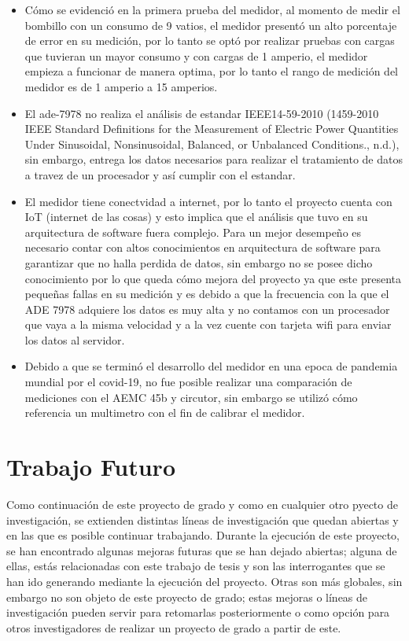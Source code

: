 \begin{itemize}
    \item Cómo se evidenció en la primera prueba del medidor, al momento de medir el bombillo con un consumo de 9 vatios, el medidor presentó un alto porcentaje de error en su medición, por lo tanto se optó por realizar pruebas con cargas que tuvieran un mayor consumo y con cargas de 1 amperio, el medidor empieza a funcionar de manera optima, por lo tanto el rango de medición del medidor es de 1 amperio a 15 amperios.
    \item El ade-7978 no realiza el análisis de estandar IEEE14-59-2010 (1459-2010 IEEE Standard Definitions for the Measurement of Electric Power Quantities Under Sinusoidal, Nonsinusoidal, Balanced, or Unbalanced Conditions., n.d.), sin embargo, entrega los datos necesarios para realizar el tratamiento de datos a travez de un procesador y así cumplir con el estandar.
    \item El medidor tiene conectvidad a internet, por lo tanto el proyecto cuenta con IoT (internet de las cosas) y esto implica que el análisis que tuvo en su arquitectura de software fuera complejo. Para un mejor desempeño es necesario contar con  altos conocimientos en arquitectura de software para garantizar que no halla perdida de datos, sin embargo no se posee dicho conocimiento por lo que queda cómo mejora del proyecto ya que este presenta pequeñas fallas en su medición y es debido a que la frecuencia con la que el ADE 7978 adquiere los datos es muy alta y no contamos con un procesador que vaya a la misma velocidad y a la vez cuente con tarjeta wifi para enviar los datos al servidor.
    \item Debido a que se terminó el desarrollo del medidor en una epoca de pandemia mundial por el covid-19, no fue posible realizar una comparación de mediciones con el AEMC 45b y circutor, sin embargo se utilizó cómo referencia un multimetro con el fin de calibrar el medidor.
\end{itemize}
\chapter{ Trabajo Futuro}
Como continuación de este proyecto de grado y como en cualquier otro pyecto de investigación, se extienden distintas líneas de investigación que quedan abiertas y en las que es posible continuar trabajando. Durante la ejecución de este proyecto, se han encontrado algunas mejoras futuras que se han dejado abiertas; alguna de ellas, estás relacionadas con este trabajo de tesis y son las interrogantes que se han ido generando mediante la ejecución del proyecto. Otras son más globales, sin embargo no son objeto de este proyecto de grado; estas mejoras o líneas de investigación pueden servir para retomarlas posteriormente o como opción para otros investigadores de realizar un proyecto de grado a partir de este. \\

